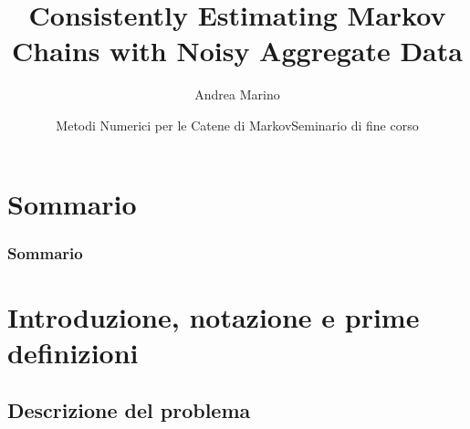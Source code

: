 \documentclass[10pt,xcolor={table,dvipsnames}]{beamer} 		%
\title[Seminario MNCM]{Consistently Estimating Markov Chains with Noisy Aggregate Data}			%
\author{Andrea Marino}
\institute[DI UniPi]{Università di Pisa}
\date[\today]{Metodi Numerici per le Catene di Markov\newline Seminario di fine corso}
\theoremstyle{plain}					%
\theoremstyle{definition}
\theoremstyle{remark}
\begin{document}
	\begin{frame}[plain]
		\titlepage
	\end{frame}
	
\section*{Sommario}
	\setcounter{tocdepth}{1}
	\begin{frame}
		\frametitle{Sommario}
		\tableofcontents
	\end{frame}
	
	\setcounter{tocdepth}{2}



\section{Introduzione, notazione e prime definizioni}
	\subsection{Descrizione del problema}
\end{document}
